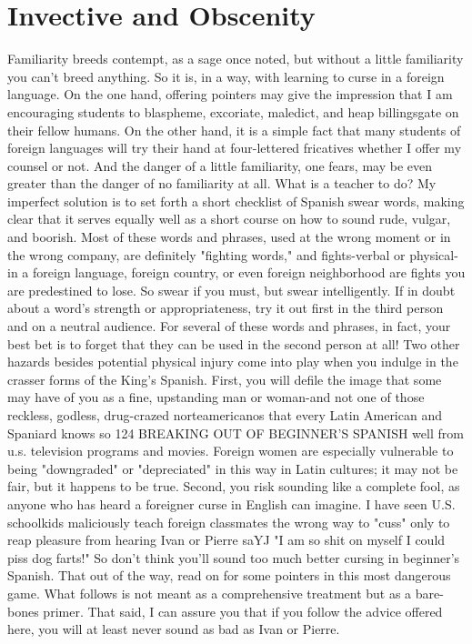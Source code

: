 \chapter{Invective and Obscenity}

Familiarity breeds contempt, as a sage once noted, but without
a little familiarity you can't breed anything. So it is, in a way, with
learning to curse in a foreign language. On the one hand, offering pointers may give the impression that I am encouraging students to blaspheme, excoriate, maledict, and heap billingsgate on their fellow humans. On the other hand, it is a simple fact that many students of
foreign languages will try their hand at four-lettered fricatives whether
I offer my counsel or not. And the danger of a little familiarity, one
fears, may be even greater than the danger of no familiarity at all. What
is a teacher to do?
My imperfect solution is to set forth a short checklist of Spanish swear words, making clear that it serves equally well as a short
course on how to sound rude, vulgar, and boorish. Most of these words
and phrases, used at the wrong moment or in the wrong company, are
definitely "fighting words," and fights-verbal or physical-in a foreign language, foreign country, or even foreign neighborhood are fights
you are predestined to lose. So swear if you must, but swear intelligently. If in doubt about a word's strength or appropriateness, try it out
first in the third person and on a neutral audience. For several of these
words and phrases, in fact, your best bet is to forget that they can be
used in the second person at all!
Two other hazards besides potential physical injury come into
play when you indulge in the crasser forms of the King's Spanish. First,
you will defile the image that some may have of you as a fine, upstanding man or woman-and not one of those reckless, godless, drug-crazed
norteamericanos that every Latin American and Spaniard knows so
124 BREAKING OUT OF BEGINNER'S SPANISH
well from u.s. television programs and movies. Foreign women are especially vulnerable to being "downgraded" or "depreciated" in this
way in Latin cultures; it may not be fair, but it happens to be true.
Second, you risk sounding like a complete fool, as anyone who
has heard a foreigner curse in English can imagine. I have seen U.S.
schoolkids maliciously teach foreign classmates the wrong way to
"cuss" only to reap pleasure from hearing Ivan or Pierre saYJ "I am so
shit on myself I could piss dog farts!" So don't think you'll sound too
much better cursing in beginner's Spanish. That out of the way, read
on for some pointers in this most dangerous game. What follows is not
meant as a comprehensive treatment but as a bare-bones primer. That
said, I can assure you that if you follow the advice offered here, you
will at least never sound as bad as Ivan or Pierre.

